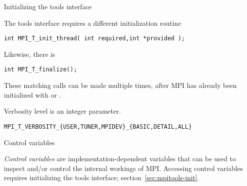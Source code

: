 
 {Initializing the tools interface}
\label{sec:mpitools-init}

The tools interface requires a different initialization routine
\begin{lstlisting}
int MPI_T_init_thread( int required,int *provided );
\end{lstlisting}
Likewise, there is 
\begin{lstlisting}
int MPI_T_finalize();
\end{lstlisting}
These matching calls can be made multiple times,
after MPI has already been initialized with
 or .

Verbosity level is an integer parameter.
\begin{verbatim}
MPI_T_VERBOSITY_{USER,TUNER,MPIDEV}_{BASIC,DETAIL,ALL}
\end{verbatim}

 {Control variables}
\label{sec:mpit-cvar}

\emph{Control variables} are implementation-dependent variables
that can be used to inspect and/or control the internal workings of MPI.
Accessing control variables requires initializing the tools interface;
section~\ref{sec:mpitools-init}.

